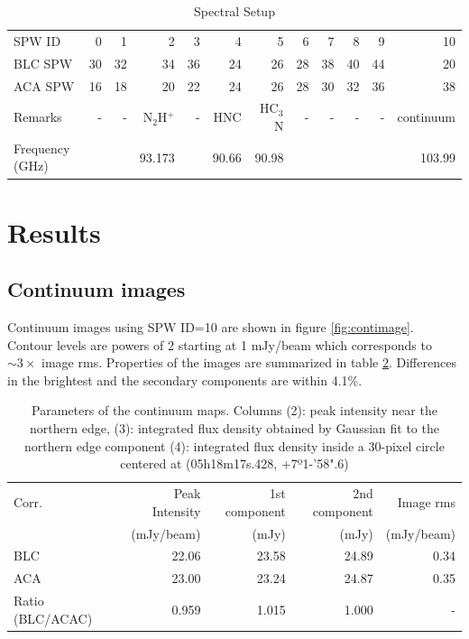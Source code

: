 \documentclass[a4paper, 10pt]{scrartcl}
\begin{document}
\begin{table}[h]
\centering
\caption{Spectral Setup}
\label{tab:SPW}
\begin{tabular}{l|r|r|r|r|r|r|r|r|r|r|r} \hline \hline
SPW ID  &  0 &  1 &  2 &  3 &  4 &  5 &  6 &  7 &  8 &  9 & 10 \\
BLC SPW & 30 & 32 & 34 & 36 & 24 & 26 & 28 & 38 & 40 & 44 & 20 \\
ACA SPW & 16 & 18 & 20 & 22 & 24 & 26 & 28 & 30 & 32 & 36 & 38 \\ \hline
Remarks &  - &  - & N$_2$H$^+$ & - & HNC & HC$_3$N &  - & - & - & - & continuum \\
Frequency (GHz)      &    &    & 93.173 & & 90.66 & 90.98 & & & & & 103.99 \\ \hline
\end{tabular}
\end{table}

\section{Results}

\subsection{Continuum images}\label{subsec:contimages}
Continuum images using SPW ID=10 are shown in figure \ref{fig:contimage}. Contour levels are powers of 2 starting at 1 mJy/beam which corresponds to $\sim 3 \times$ image rms.
Properties of the images are summarized in table \ref{tab:contimage}. Differences in the brightest and the secondary components are within 4.1\%.

\begin{table}[h]
\centering
\caption{Parameters of the continuum maps. Columns (2): peak intensity near the northern edge, (3): integrated flux density obtained by Gaussian fit to the northern edge component (4): integrated flux density inside a 30-pixel circle centered at (05h18m17s.428, +7º1-'58".6) }
\label{tab:contimage}
\begin{tabular}{l|r|r|r|r} \hline \hline
Corr.  & Peak Intensity   & 1st component & 2nd component & Image rms\\
       & (mJy/beam)       & (mJy)         & (mJy)         & (mJy/beam) \\ \hline
BLC    & 22.06            & 23.58         &  24.89        & 0.34                 \\
ACA    & 23.00            & 23.24         &  24.87        & 0.35                 \\ 
Ratio (BLC/ACAC) & 0.959  & 1.015         &  1.000        & -                    \\ \hline
\end{tabular}
\end{table}
\end{document}
